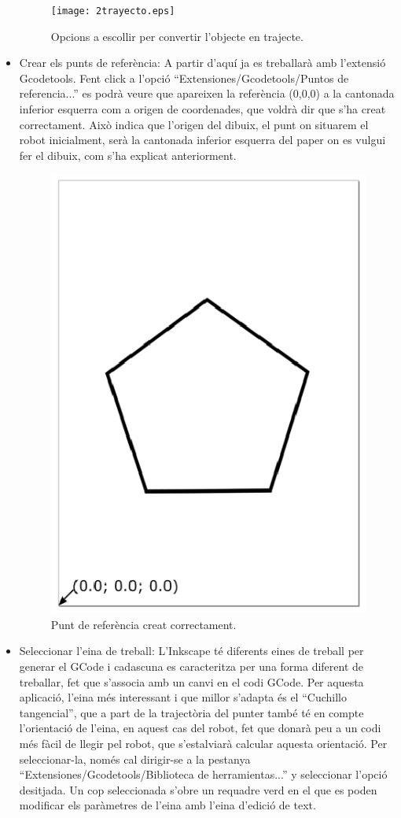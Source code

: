 \begin{itemize}
	\begin{figure}[H]
		\centering
		\texttt{[image: 2trayecto.eps]}
		\caption{Opcions a escollir per convertir l'objecte en trajecte.}
		\label{fig:objeto a trayecto}
	\end{figure}
	
	\item Crear els punts de referència: A partir d'aquí ja es treballarà amb l'extensió Gcodetools. Fent click a l'opció “Extensiones/Gcodetools/Puntos de referencia...” es podrà veure que apareixen la referència (0,0,0) a la cantonada inferior esquerra com a origen de coordenades, que voldrà dir que s'ha creat correctament. Això indica que l'origen del dibuix, el punt on situarem el robot inicialment, serà la cantonada inferior esquerra del paper on es vulgui fer el dibuix, com s'ha explicat anteriorment.
	
	\begin{figure}[H]
		\centering
		\includegraphics[width=0.40\linewidth]{3PuntosReferencia.eps}
		\caption{Punt de referència creat correctament.}
		\label{fig:PuntosReferencia}
	\end{figure}
	
	\item Seleccionar l'eina de treball: L'Inkscape té diferents eines de treball per generar el GCode i cadascuna es caracteritza per una forma diferent de treballar, fet que s'associa amb un canvi en el codi GCode. Per aquesta aplicació, l'eina més interessant i que millor s'adapta és el “Cuchillo tangencial”, que a part de la trajectòria del punter també té en compte l'orientació de l'eina, en aquest cas del robot, fet que donarà peu a un codi més fàcil de llegir pel robot, que s'estalviarà calcular aquesta orientació. Per seleccionar-la, només cal dirigir-se a la pestanya “Extensiones/Gcodetools/Biblioteca de herramientas...” y seleccionar l'opció desitjada. Un cop seleccionada s'obre un requadre verd en el que es poden modificar els paràmetres de l'eina amb l'eina d'edició de text.
	

\end{itemize}
